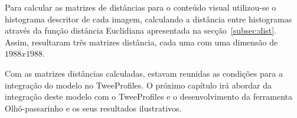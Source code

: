 Para calcular as matrizes de distâncias para o conteúdo visual utilizou-se o histograma descritor de cada imagem, calculando a distância entre histogramas através da função distância Euclidiana apresentada na secção~\ref{subsec:dist}. Assim, resultaram três matrizes distância, cada uma com uma dimensão de $1988 x 1988$.

Com as matrizes distâncias calculadas, estavam reunidas as condições para a integração do modelo no TweeProfiles. O próximo capítulo irá abordar da integração deste modelo com o TweeProfiles e o desenvolvimento da ferramenta Olhó-passarinho e os seus resultados ilustrativos.